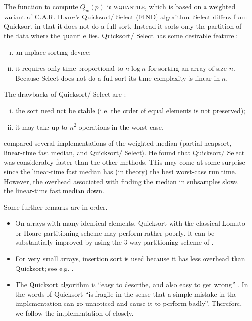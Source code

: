 \documentclass[a4paper,oneside,11pt,DIV=12]{scrartcl}
\begin{document}
The function to compute $Q_w(p)$ is \textsc{wquantile}, which is based on a weighted variant of C.A.R. Hoare's Quicksort/ Select (FIND) algorithm. Select differs from Quicksort in that it does not do a full sort. Instead it sorts only the partition of the data where the quantile lies. Quicksort/ Select has some desirable feature \citep[][p. 303]{sedgewick_1997}:
\begin{enumerate}[i)]
	\item an inplace sorting device; 
	\item it requires only time proportional to $n \log n$ for sorting an array of size $n$. Because Select does not do a full sort its time complexity is linear in $n$. 
\end{enumerate}

\noindent The drawbacks of Quicksort/ Select are \citep[][p. 303]{sedgewick_1997}:
\begin{enumerate}[i)]
	\item the sort need not be stable (i.e. the order of equal elements is not preserved); 
	\item it may take up to $n^2$ operations in the worst case. 
\end{enumerate}

\citet{gurwitz_1990} compared several implementations of the weighted median (partial heapsort, linear-time fast median, and Quicksort/ Select). He found that Quicksort/ Select was considerably faster than the other methods. This may come at some surprise since the linear-time fast median has (in theory) the best worst-case run time. However, the overhead associated with finding the median in subsamples slows the linear-time fast median down. 

Some further remarks are in order.
\begin{itemize}
	\item On arrays with many identical elements, Quicksort with the classical Lomuto or Hoare partitioning scheme may perform rather poorly. It can be substantially improved by using the 3-way partitioning scheme of \cite{bentley_mcilroy_1993}. 
	\item For very small arrays, insertion sort is used because it has less overhead than Quicksort; see e.g. \cite[][p. 316]{sedgewick_1997}.  
	\item The Quicksort algorithm is ``easy to describe, and also easy to get wrong'' \citep[][p. 1252]{bentley_mcilroy_1993}. In the words of \citet[][p. 303]{sedgewick_1997} Quicksort ``is fragile in the sense that a simple mistake in the implementation can go unnoticed and cause it to perform badly''. Therefore, we follow the implementation of \citet{bentley_mcilroy_1993} closely.
\end{itemize}
\end{document}
